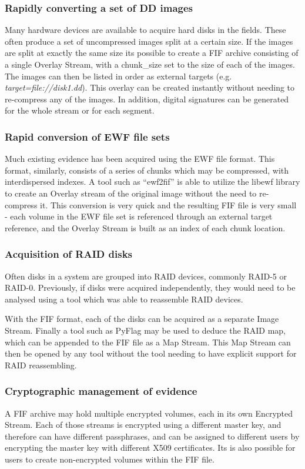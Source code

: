 \documentclass[10pt, conference]{IEEEtran}
\begin{document}
\subsubsection{Rapidly converting a set of DD images}
Many hardware devices are available to acquire hard disks in the
fields. These often produce a set of uncompressed images split at a
certain size. If the images are split at exactly the same size its
possible to create a FIF archive consisting of a single Overlay
Stream, with a chunk\_size set to the size of each of the images. The
images can then be listed in order as external targets (e.g. {\em
target=file://disk1.dd}). This overlay can be created instantly
without needing to re-compress any of the images. In addition, digital
signatures can be generated for the whole stream or for each segment.

\subsubsection{Rapid conversion of EWF file sets}
Much existing evidence has been acquired using the EWF file
format. This format, similarly, consists of a series of chunks which
may be compressed, with interdispersed indexes. A tool such as
``ewf2fif'' is able to utilize the libewf library to create an Overlay
stream of the original image without the need to re-compress it. This
conversion is very quick and the resulting FIF file is very small -
each volume in the EWF file set is referenced through an external
target reference, and the Overlay Stream is built as an index of each
chunk location.

\subsubsection{Acquisition of RAID disks}
Often disks in a system are grouped into RAID devices, commonly RAID-5
or RAID-0. Previously, if disks were acquired independently, they
would need to be analysed using a tool which was able to reassemble
RAID devices.

With the FIF format, each of the disks can be acquired as a separate
Image Stream. Finally a tool such as PyFlag may be used to deduce the
RAID map, which can be appended to the FIF file as a Map Stream. This
Map Stream can then be opened by any tool without the tool needing to
have explicit support for RAID reassembling.

\subsubsection{Cryptographic management of evidence}
A FIF archive may hold multiple encrypted volumes, each in its own
Encrypted Stream. Each of those streams is encrypted using a different
master key, and therefore can have different passphrases, and can be
assigned to different users by encrypting the master key with
different X509 certificates. Its is also possible for users to create
non-encrypted volumes within the FIF file.
\end{document}
